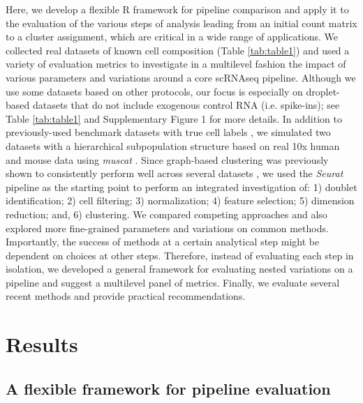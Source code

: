 \documentclass{bmcart}
\begin{document}
Here, we develop a flexible R framework for pipeline comparison and apply it to the evaluation of the various steps of analysis leading from an initial count matrix to a cluster assignment, which are critical in a wide range of applications. We collected real datasets of known cell composition (Table \ref{tab:table1}) and used a variety of evaluation metrics to investigate in a multilevel fashion the impact of various parameters and variations around a core scRNAseq pipeline. Although we use some datasets based on other protocols, our focus is especially on droplet-based datasets that do not include exogenous control RNA (i.e. spike-ins); see Table \ref{tab:table1} and Supplementary Figure 1 for more details. In addition to previously-used benchmark datasets with true cell labels \cite{duoClustering2018,tianMixology2018}, we simulated two datasets with a hierarchical subpopulation structure based on real 10x human and mouse data using \textit{muscat} \cite{CrowellMuscat2019}. 
Since graph-based clustering \cite{satijaSeurat2015} was previously shown to consistently perform well across several datasets \cite{duoClustering2018,tianMixology2018}, we used the \textit{Seurat} pipeline as the starting point to perform an integrated investigation of: 1) doublet identification; 2) cell filtering; 3) normalization; 4) feature selection; 5) dimension reduction; and, 6) clustering. We compared competing approaches and also explored more fine-grained parameters and variations on common methods. Importantly, the success of methods at a certain analytical step might be dependent on choices at other steps. Therefore, instead of evaluating each step in isolation, we developed a general framework for evaluating nested variations on a pipeline and suggest a multilevel panel of metrics. Finally, we evaluate several recent methods and provide practical recommendations.

\section*{Results}

\subsection*{A flexible framework for pipeline evaluation}
\end{document}
